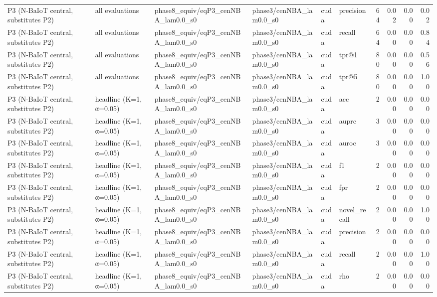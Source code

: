 \begin{tabular}{llllllrrrr}
P3 (N-BaIoT central, substitutes P2) & all evaluations & phase8\_equiv/eqP3\_cenNBA\_lam0.0\_s0 & phase3/cenNBA\_lam0.0\_s0 & cuda & precision & 64 & 0.02 & 0.00 & 0.02 \\
P3 (N-BaIoT central, substitutes P2) & all evaluations & phase8\_equiv/eqP3\_cenNBA\_lam0.0\_s0 & phase3/cenNBA\_lam0.0\_s0 & cuda & recall & 64 & 0.00 & 0.00 & 0.84 \\
P3 (N-BaIoT central, substitutes P2) & all evaluations & phase8\_equiv/eqP3\_cenNBA\_lam0.0\_s0 & phase3/cenNBA\_lam0.0\_s0 & cuda & tpr@1 & 80 & 0.00 & 0.00 & 0.56 \\
P3 (N-BaIoT central, substitutes P2) & all evaluations & phase8\_equiv/eqP3\_cenNBA\_lam0.0\_s0 & phase3/cenNBA\_lam0.0\_s0 & cuda & tpr@5 & 80 & 0.00 & 0.00 & 1.00 \\
P3 (N-BaIoT central, substitutes P2) & headline (K=1, α=0.05) & phase8\_equiv/eqP3\_cenNBA\_lam0.0\_s0 & phase3/cenNBA\_lam0.0\_s0 & cuda & acc & 2 & 0.00 & 0.00 & 0.00 \\
P3 (N-BaIoT central, substitutes P2) & headline (K=1, α=0.05) & phase8\_equiv/eqP3\_cenNBA\_lam0.0\_s0 & phase3/cenNBA\_lam0.0\_s0 & cuda & auprc & 3 & 0.00 & 0.00 & 0.00 \\
P3 (N-BaIoT central, substitutes P2) & headline (K=1, α=0.05) & phase8\_equiv/eqP3\_cenNBA\_lam0.0\_s0 & phase3/cenNBA\_lam0.0\_s0 & cuda & auroc & 3 & 0.00 & 0.00 & 0.00 \\
P3 (N-BaIoT central, substitutes P2) & headline (K=1, α=0.05) & phase8\_equiv/eqP3\_cenNBA\_lam0.0\_s0 & phase3/cenNBA\_lam0.0\_s0 & cuda & f1 & 2 & 0.00 & 0.00 & 0.00 \\
P3 (N-BaIoT central, substitutes P2) & headline (K=1, α=0.05) & phase8\_equiv/eqP3\_cenNBA\_lam0.0\_s0 & phase3/cenNBA\_lam0.0\_s0 & cuda & fpr & 2 & 0.00 & 0.00 & 0.00 \\
P3 (N-BaIoT central, substitutes P2) & headline (K=1, α=0.05) & phase8\_equiv/eqP3\_cenNBA\_lam0.0\_s0 & phase3/cenNBA\_lam0.0\_s0 & cuda & novel\_recall & 2 & 0.00 & 0.00 & 1.00 \\
P3 (N-BaIoT central, substitutes P2) & headline (K=1, α=0.05) & phase8\_equiv/eqP3\_cenNBA\_lam0.0\_s0 & phase3/cenNBA\_lam0.0\_s0 & cuda & precision & 2 & 0.00 & 0.00 & 0.00 \\
P3 (N-BaIoT central, substitutes P2) & headline (K=1, α=0.05) & phase8\_equiv/eqP3\_cenNBA\_lam0.0\_s0 & phase3/cenNBA\_lam0.0\_s0 & cuda & recall & 2 & 0.00 & 0.00 & 1.00 \\
P3 (N-BaIoT central, substitutes P2) & headline (K=1, α=0.05) & phase8\_equiv/eqP3\_cenNBA\_lam0.0\_s0 & phase3/cenNBA\_lam0.0\_s0 & cuda & rho & 2 & 0.00 & 0.00 & 0.00 \\

\end{tabular}
